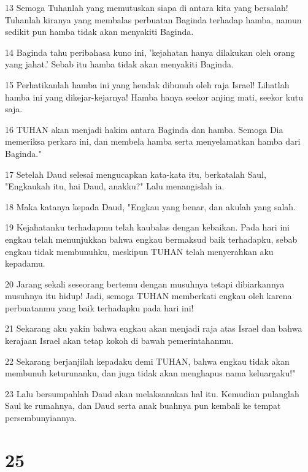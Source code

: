 \par 13 Semoga Tuhanlah yang memutuskan siapa di antara kita yang bersalah! Tuhanlah kiranya yang membalas perbuatan Baginda terhadap hamba, namun sedikit pun hamba tidak akan menyakiti Baginda.
\par 14 Baginda tahu peribahasa kuno ini, 'kejahatan hanya dilakukan oleh orang yang jahat.' Sebab itu hamba tidak akan menyakiti Baginda.
\par 15 Perhatikanlah hamba ini yang hendak dibunuh oleh raja Israel! Lihatlah hamba ini yang dikejar-kejarnya! Hamba hanya seekor anjing mati, seekor kutu saja.
\par 16 TUHAN akan menjadi hakim antara Baginda dan hamba. Semoga Dia memeriksa perkara ini, dan membela hamba serta menyelamatkan hamba dari Baginda."
\par 17 Setelah Daud selesai mengucapkan kata-kata itu, berkatalah Saul, "Engkaukah itu, hai Daud, anakku?" Lalu menangislah ia.
\par 18 Maka katanya kepada Daud, "Engkau yang benar, dan akulah yang salah.
\par 19 Kejahatanku terhadapmu telah kaubalas dengan kebaikan. Pada hari ini engkau telah menunjukkan bahwa engkau bermaksud baik terhadapku, sebab engkau tidak membunuhku, meskipun TUHAN telah menyerahkan aku kepadamu.
\par 20 Jarang sekali seseorang bertemu dengan musuhnya tetapi dibiarkannya musuhnya itu hidup! Jadi, semoga TUHAN memberkati engkau oleh karena perbuatanmu yang baik terhadapku pada hari ini!
\par 21 Sekarang aku yakin bahwa engkau akan menjadi raja atas Israel dan bahwa kerajaan Israel akan tetap kokoh di bawah pemerintahanmu.
\par 22 Sekarang berjanjilah kepadaku demi TUHAN, bahwa engkau tidak akan membunuh keturunanku, dan juga tidak akan menghapus nama keluargaku!"
\par 23 Lalu bersumpahlah Daud akan melaksanakan hal itu. Kemudian pulanglah Saul ke rumahnya, dan Daud serta anak buahnya pun kembali ke tempat persembunyiannya.

\chapter{25}

